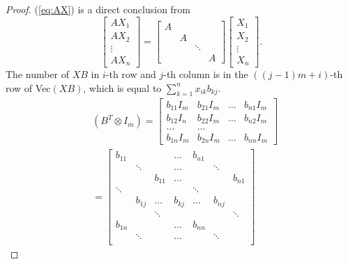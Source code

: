 \begin{proof}
   (\ref{eq:AX}) is a direct conclusion from
  \begin{displaymath}
      \begin{bmatrix}
     AX_1\\
      AX_2\\
      \vdots\\
      AX_n
    \end{bmatrix}
    =
    \begin{bmatrix}
      A & & & \\
      & A &  & \\
      & & \ddots & \\
      & & & A
    \end{bmatrix}
  \begin{bmatrix}
      X_1\\
      X_2\\
      \vdots\\
      X_n
    \end{bmatrix}.
  \end{displaymath}
  The number of $XB$ in $i$-th row and $j$-th column
  is in the $((j-1)m+i)$-th row of Vec$(XB)$,
  which is equal to $\sum_{k=1}^{n}x_{ik}b_{kj}$.
  \begin{displaymath}
    \begin{aligned}
    &(B^T\otimes I_m)=
    \begin{bmatrix}
      b_{11}I_m & b_{21}I_m &\ldots & b_{n1}I_m\\
      b_{12}I_n & b_{22}I_m & \ldots & b_{n2}I_m\\
      \ldots & \ldots & & \\
      b_{1n}I_m & b_{2n}I_m & \ldots & b_{nn}I_m
    \end{bmatrix}\\
      & =
      \begin{bmatrix}
        b_{11} & & & \ldots&b_{n1} & &\\
        &\ddots &  &\ldots & &\ddots & \\
        & & b_{11}& \ldots & & &b_{n1}\\
        \ddots &  & & &\ddots & & \\
         & b_{1j} &\ldots  & b_{kj}&\ldots & b_{nj}& \\
        &  & \ddots & & & & \ddots\\
                      b_{1n} & & & \ldots&b_{nn} & &\\
        &\ddots &  &\ldots & &\ddots & \\

\end{bmatrix}
\end{aligned}
\end{displaymath}
\end{proof}
